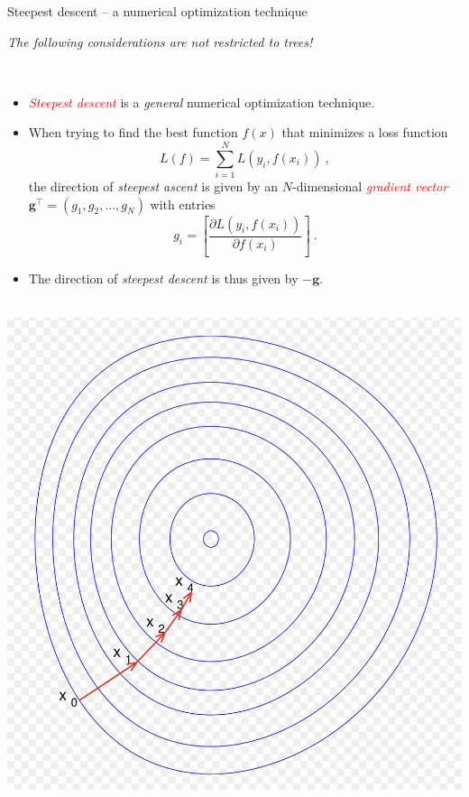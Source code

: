 \documentclass[
  10pt,
  ignorenonframetext,
]{beamer}
\providecommand{\tightlist}{%
  \setlength{\itemsep}{0pt}\setlength{\parskip}{0pt}}
\begin{document}
\begin{frame}
\begin{block}{Steepest descent -- a numerical optimization technique}
\label{steepest-descent-a-numerical-optimization-technique}
\(~\)

\emph{The following considerations are not restricted to trees!}

\(~\)

\begin{itemize}
\tightlist
\item
  \emph{\textcolor{red}{Steepest descent}} is a \emph{general} numerical
  optimization technique.
\end{itemize}

\vspace{2mm}

\begin{itemize}
\tightlist
\item
  When trying to find the best function \(f(x)\) that minimizes a loss
  function \[L(f) = \sum_{i=1}^N L(y_i,f(x_i)) \ ,\] the direction of
  \emph{steepest ascent} is given by an \(N\)-dimensional
  \emph{\textcolor{red}{gradient vector}}
  \(\mathbf{g}^\top = (g_{1},g_{2},\ldots, g_{N})\) with entries
  \[g_{i} = \left[ \frac{\partial L(y_i,f(x_i))}{\partial f(x_i)} \right] \ .\]
\end{itemize}

\vspace{2mm}

\begin{itemize}
\tightlist
\item
  The direction of \emph{steepest descent} is thus given by
  \(-\mathbf{g}\).
\end{itemize}
\end{block}
\end{frame}

\begin{frame}
\(~\) \includegraphics{graphics/Steepest_descet.png}
\end{frame}
\end{document}

